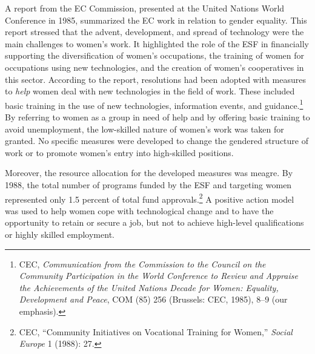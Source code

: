 \documentclass{tufte-handout}
\begin{document}
A report from the EC Commission, presented at the United Nations World
Conference in 1985, summarized the EC work in relation to gender
equality. This report stressed that the advent, development, and spread
of technology were the main challenges to women's work. It highlighted
the role of the ESF in financially supporting the diversification of
women's occupations, the training of women for occupations using new
technologies, and the creation of women's cooperatives in this sector.
According to the report, resolutions had been adopted with measures to
\emph{help} women deal with new technologies in the field of work. These
included basic training in the use of new technologies, information
events, and guidance.\footnote{CEC, \emph{Communication from the
  Commission to the Council on the Community Participation in the World
  Conference to Review and Appraise the Achievements of the United
  Nations Decade for Women: Equality, Development and Peace}, COM (85)
  256 (Brussels: CEC, 1985), 8--9 (our emphasis).} By referring to women
as a group in need of help and by offering basic training to avoid
unemployment, the low-skilled nature of women's work was taken for
granted. No specific measures were developed to change the gendered
structure of work or to promote women's entry into high-skilled
positions.

Moreover, the resource allocation for the developed measures was meagre.
By 1988, the total number of programs funded by the ESF and targeting
women represented only 1.5 percent of total fund approvals.\footnote{CEC,
  ``Community Initiatives on Vocational Training for Women,''
  \emph{Social Europe} 1 (1988): 27.} A positive action model was used
to help women cope with technological change and to have the opportunity
to retain or secure a job, but not to achieve high-level qualifications
or highly skilled employment.
\end{document}

